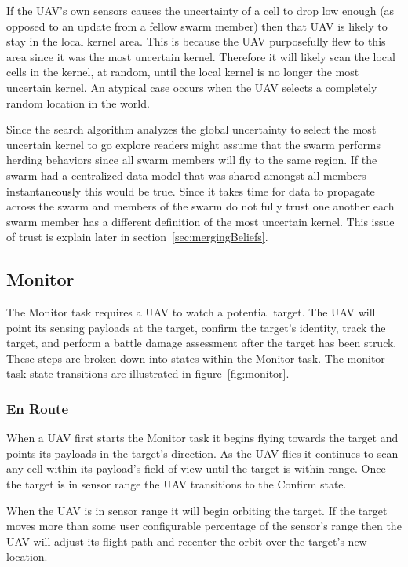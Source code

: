 If the UAV's own sensors causes the uncertainty of a cell to drop low enough (as opposed to an update from a fellow swarm member) then that UAV is likely to stay in the local kernel area.  This is because the UAV purposefully flew to this area since it was the most uncertain kernel.  Therefore it will likely scan the local cells in the kernel, at random, until the local kernel is no longer the most uncertain kernel.  An atypical case occurs when the UAV selects a completely random location in the world.

Since the search algorithm analyzes the global uncertainty to select the most uncertain kernel to go explore readers might assume that the swarm performs herding behaviors since all swarm members will fly to the same region.  If the swarm had a centralized data model that was shared amongst all members instantaneously this would be true.  Since it takes time for data to propagate across the swarm and members of the swarm do not fully trust one another each swarm member has a different definition of the most uncertain kernel.  This issue of trust is explain later in section~\ref{sec:mergingBeliefs}.

\subsection{Monitor}
The Monitor task requires a UAV to watch a potential target.  The UAV will point its sensing payloads at the target, confirm the target's identity, track the target, and perform a battle damage assessment after the target has been struck.  These steps are broken down into states within the Monitor task.  The monitor task state transitions are illustrated in figure~\ref{fig:monitor}.

\subsubsection{En Route}
When a UAV first starts the Monitor task it begins flying towards the target and points its payloads in the target's direction.  As the UAV flies it continues to scan any cell within its payload's field of view until the target is within range.  Once the target is in sensor range the UAV transitions to the Confirm state.  

When the UAV is in sensor range it will begin orbiting the target.  If the target moves more than some user configurable percentage of the sensor's range then the UAV will adjust its flight path and recenter the orbit over the target's new location.

